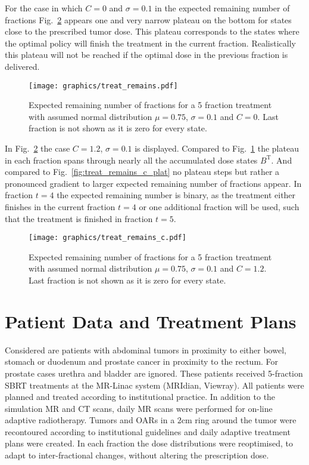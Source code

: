 \documentclass[\relativeRoot/ada.tex]{subfiles}
\begin{document}
For the case in which $C=0$ and $\sigma=0.1$ in the expected remaining number of fractions Fig.~\ref{fig:treat_remains_c} appears one and very narrow plateau on the bottom for states close to the prescribed tumor dose. This plateau corresponds to the states where the optimal policy will finish the treatment in the current fraction. Realistically this plateau will not be reached if the optimal dose in the previous fraction is delivered.

\begin{figure}[!htb]
    \centering
    \texttt{[image: graphics/treat\_remains.pdf]}
    \caption{Expected remaining number of fractions for a 5 fraction treatment with assumed normal distribution $\mu=0.75$, $\sigma=0.1$ and $C=0$. Last fraction is not shown as it is zero for every state.}
    \label{fig:treat_remains}
\end{figure}

In Fig.~\ref{fig:treat_remains_c} the case $C=1.2$, $\sigma=0.1$ is displayed. Compared to Fig.~\ref{fig:treat_remains} the plateau in each fraction spans through nearly all the accumulated dose states $B^{\text{T}}$. And compared to Fig.~\ref{fig:treat_remains_c_plat} no plateau steps but rather a pronounced gradient to larger expected remaining number of fractions appear. In fraction $t=4$ the expected remaining number is binary, as the treatment either finishes in the current fraction $t=4$ or one additional fraction will be used, such that the treatment is finished in fraction $t=5$.

\begin{figure}[!htb]
    \centering
    \texttt{[image: graphics/treat\_remains\_c.pdf]}
    \caption{Expected remaining number of fractions for a 5 fraction treatment with assumed normal distribution $\mu=0.75$, $\sigma=0.1$ and $C=1.2$. Last fraction is not shown as it is zero for every state.}
    \label{fig:treat_remains_c}
\end{figure}

\section{Patient Data and Treatment Plans}

Considered are patients with abdominal tumors in proximity to either bowel, stomach or duodenum and prostate cancer in proximity to the rectum. For prostate cases urethra and bladder are ignored. These patients received 5-fraction SBRT treatments at the MR-Linac system (MRIdian, Viewray). All patients were planned and treated according to institutional practice. In addition to the simulation MR and CT scans, daily MR scans were performed for on-line adaptive radiotherapy. Tumors and OARs in a $2$cm ring around the tumor were recontoured according to institutional guidelines and daily adaptive treatment plans were created. In each fraction the dose distributions were reoptimised, to adapt to inter-fractional changes, without altering the prescription dose.
\end{document}
